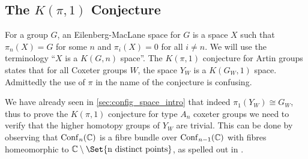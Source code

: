 \documentclass[class=article, crop=false]{standalone}
\begin{document}
	
\subsection{The $K(\pi,1)$ Conjecture}
For a group $G$, an Eilenberg-MacLane space \cite{eilenberg_relations_1945} for $G$ is a space $X$ such that $\pi_n(X)=G$ for some $n$ and $\pi_i(X) = 0$ for all $i\neq n$. We will use the terminology ``$X$ is a $K(G,n)$ space''. The $K(\pi,1)$ conjecture for Artin groups states that for all Coxeter groups $W$, the space $Y_W$ is a $K(G_W,1)$ space. Admittedly the use of $\pi$ in the name of the conjecture is confusing.

We have already seen in \cref{sec:config_space_intro} that indeed $\pi_1(Y_W) \cong G_W$, thus to prove the $K(\pi, 1)$ conjecture for type $A_n$ coxeter groups we need to verify that the higher homotopy groups of $Y_W$ are trivial. This can be done by observing that $\operatorname{Conf}_n(\mathbb{C})$ is a fibre bundle over $\operatorname{Conf}_{n-1}(\mathbb{C})$ with fibres homeomorphic to $\C \setminus \Set{\text{n distinct points}}$, as spelled out in \cite{sinha_homology_2010}.
\end{document}

